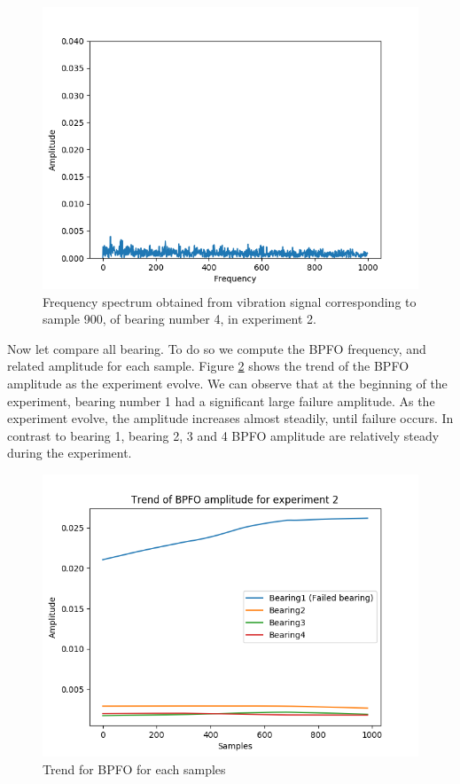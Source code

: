 \documentclass[../Main/thesis.tex]{subfiles}
\begin{document}
\begin{figure}[H] 
   \centering
   \includegraphics[width=6in]{../fig/experiment2_bearing4_fft.png} 
   \caption{Frequency spectrum obtained from vibration signal corresponding to sample 900, of bearing number 4, in experiment 2.}
   \label{fig:bearing4-experiment2-fft}
\end{figure}
\justify
Now let compare all bearing. To do so we compute the BPFO frequency, and related amplitude for each sample. Figure \ref{fig:experiment2_bearing_fft_trend} shows 
the trend of the BPFO amplitude as the experiment evolve. We can observe that at the beginning of the experiment, bearing number 1 had a significant large failure amplitude.
As the experiment evolve, the amplitude increases almost steadily, until failure occurs. In contrast to bearing 1, bearing 2, 3 and 4 BPFO amplitude are relatively steady during the experiment. 
\begin{figure}[H] 
   \centering
   \includegraphics[width=6in]{../fig/experiment2_bearing_fft_trend.png} 
   \caption{Trend for BPFO for each samples}
   \label{fig:experiment2_bearing_fft_trend}
\end{figure}
\end{document}
